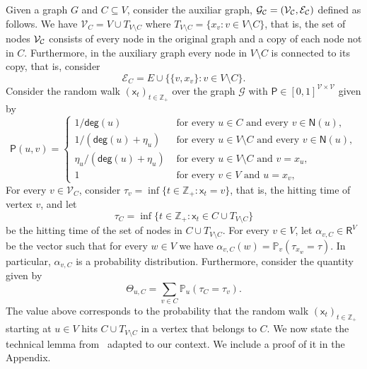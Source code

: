 \documentclass[letterpaper,11pt]{article}
\newcommand{\PP}{\mathbb{P}}
\newcommand{\RR}{\mathsf{R}}
\newcommand{\ZZ}{\mathbb{Z}}
\newcommand{\nsf}{\mathsf{N}}
\newcommand{\degsf}{\mathsf{deg}}
\newcommand{\psf}{\mathsf{P}}
\newcommand{\xsf}{\mathsf{x}}
\newcommand{\vvcom}[1]{\todo[color=red!25!white]{Victor: #1}}
\begin{document}
 Given a graph $G$ and $C\subseteq V$, consider the auxiliar graph, $\cal{G_C}=(\cal{V}_C,\cal{E}_C)$ defined as follows. 
We have $\mathcal{V}_C=V\cup T_{V\setminus C}$ where $T_{V\setminus C}=\{x_v:v\in V\setminus C\}$, that is, the set of nodes $\cal{V}_C$ consists of every node in the original graph and a copy of each node not in $C$. 
Furthermore, in the auxiliary graph every node in $V\setminus C$ is connected to its copy, that is, consider 
\begin{equation*}
\mathcal{E}_C=E\cup \Big\{\{v,x_v\}:v\in V\setminus C\Big\}.
\end{equation*}
Consider the random walk $(\xsf_t)_{t\in \ZZ_+}$ over the graph $\mathcal{G}$ with $\psf\in [0,1]^{\mathcal{V}\times \mathcal{V}}$ given by
\[
\psf(u,v)=
\begin{cases}
1/\degsf(u) & \text{ for every }u\in C\text{ and every }v\in \nsf(u),\\
1/(\degsf(u)+\eta_u)& \text{ for every }u\in V\setminus C\text{ and every }v\in \nsf(u),\\
\eta_u/(\degsf(u)+\eta_u) & \text{ for every }u\in V\setminus C\text{ and }v=x_u,\\
1 & \text{ for every }v\in V\text{ and }u=x_v,
\end{cases}
\]
For every $v\in \mathcal{V}_C$, consider $\tau_v=\inf\{t\in \ZZ_+:\xsf_t=v\}$, that is, the hitting time of vertex $v$, and let 
\begin{equation*}
\tau_C=\inf\Big\{t\in \ZZ_+:\xsf_t\in C\cup T_{V\setminus C}\Big\}
\end{equation*}
be the hitting time of the set of nodes in $C\cup T_{V\setminus C}$.
For every $v\in V$, let $\alpha_{v,C}\in \RR^{V}$ be the vector such that for every $w\in V$ we have $\alpha_{v,C}(w)=\PP_v(\tau_{x_w}=\tau)$. 
In particular, $\alpha_{v,C}$ is a probability distribution.
Furthermore, consider the quantity given by
\begin{equation*}
\Theta_{u,C}=\sum_{v\in C}\PP_u(\tau_C=\tau_{v}).
\end{equation*}
The value above corresponds to the probability that the random walk $(\xsf_t)_{t\in \ZZ_+}$ starting at $u\in V$ hits $C\cup T_{V\setminus C}$ in a vertex that belongs to $C$.
We now state the technical lemma from~\cite{} adapted to our context.
We include a proof of it in the Appendix. 
\end{document}
